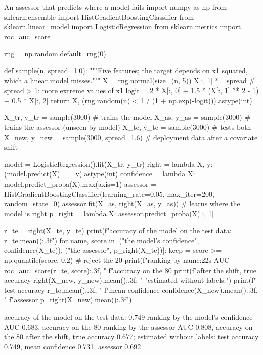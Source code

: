 \begin{pylisting}[label={lst:assessor}]{An assessor that predicts where a model fails}
import numpy as np
from sklearn.ensemble import HistGradientBoostingClassifier
from sklearn.linear_model import LogisticRegression
from sklearn.metrics import roc_auc_score

rng = np.random.default_rng(0)

def sample(n, spread=1.0):
    """Five features; the target depends on x1 squared, which a linear model misses."""
    X = rng.normal(size=(n, 5))
    X[:, 1] *= spread                            # spread > 1: more extreme values of x1
    logit = 2 * X[:, 0] + 1.5 * (X[:, 1] ** 2 - 1) + 0.5 * X[:, 2]
    return X, (rng.random(n) < 1 / (1 + np.exp(-logit))).astype(int)

X_tr, y_tr = sample(3000)                        # trains the model
X_as, y_as = sample(3000)                        # trains the assessor (unseen by model)
X_te, y_te = sample(3000)                        # tests both
X_new, y_new = sample(3000, spread=1.6)          # deployment data after a covariate shift

model = LogisticRegression().fit(X_tr, y_tr)
right = lambda X, y: (model.predict(X) == y).astype(int)
confidence = lambda X: model.predict_proba(X).max(axis=1)
assessor = HistGradientBoostingClassifier(learning_rate=0.05, max_iter=200, random_state=0)
assessor.fit(X_as, right(X_as, y_as))            # learns where the model is right
p_right = lambda X: assessor.predict_proba(X)[:, 1]

r_te = right(X_te, y_te)
print(f"accuracy of the model on the test data: {r_te.mean():.3f}")
for name, score in [("the model's confidence", confidence(X_te)),
                    ("the assessor", p_right(X_te))]:
    keep = score >= np.quantile(score, 0.2)      # reject the 20%
    print(f"ranking by {name:22s} AUC {roc_auc_score(r_te, score):.3f}, "
          f"accuracy on the 80%
print(f"after the shift, true accuracy {right(X_new, y_new).mean():.3f}; "
      "estimated without labels:")
print(f"  test accuracy {r_te.mean():.3f}, "
      f"mean confidence {confidence(X_new).mean():.3f}, "
      f"assessor {p_right(X_new).mean():.3f}")
\end{pylisting}
\begin{pyoutput}
accuracy of the model on the test data: 0.749
ranking by the model's confidence AUC 0.683, accuracy on the 80%
ranking by the assessor           AUC 0.808, accuracy on the 80%
after the shift, true accuracy 0.677; estimated without labels:
  test accuracy 0.749, mean confidence 0.731, assessor 0.692
\end{pyoutput}

